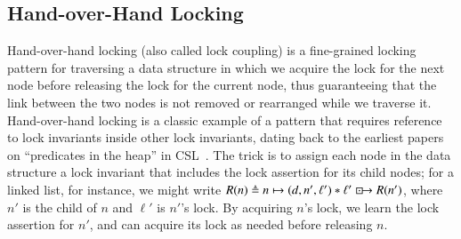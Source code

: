 \documentclass[runningheads]{llncs}
\newcommand{\islock}{\boxdotright}
\begin{document}
\subsection{Hand-over-Hand Locking}
\label{selflock}

Hand-over-hand locking (also called lock coupling) is a fine-grained locking pattern for traversing a data structure in which we acquire the lock for the next node before releasing the lock for the current node, thus guaranteeing that the link between the two nodes is not removed or rearranged while we traverse it. Hand-over-hand locking is a classic example of a pattern that requires reference to lock invariants inside other lock invariants, dating back to the earliest papers on ``predicates in the heap'' in CSL~\cite{gotsman}. The trick is to assign each node in the data structure a lock invariant that includes the lock assertion for its child nodes; for a linked list, for instance, we might write $R(n) \triangleq n \mapsto (d, n', \ell') * \ell' \islock R(n')$, where $n'$ is the child of $n$ and $\ell'$ is $n'$'s lock. By acquiring $n$'s lock, we learn the lock assertion for $n'$, and can acquire its lock as needed before releasing $n$.
\end{document}
